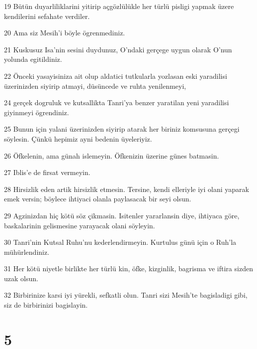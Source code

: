 \par 19 Bütün duyarliliklarini yitirip açgözlülükle her türlü pisligi yapmak üzere kendilerini sefahate verdiler.
\par 20 Ama siz Mesih'i böyle ögrenmediniz.
\par 21 Kuskusuz Isa'nin sesini duydunuz, O'ndaki gerçege uygun olarak O'nun yolunda egitildiniz.
\par 22 Önceki yasayisiniza ait olup aldatici tutkularla yozlasan eski yaradilisi üzerinizden siyirip atmayi, düsüncede ve ruhta yenilenmeyi,
\par 24 gerçek dogruluk ve kutsallikta Tanri'ya benzer yaratilan yeni yaradilisi giyinmeyi ögrendiniz.
\par 25 Bunun için yalani üzerinizden siyirip atarak her biriniz komsusuna gerçegi söylesin. Çünkü hepimiz ayni bedenin üyeleriyiz.
\par 26 Öfkelenin, ama günah islemeyin. Öfkenizin üzerine günes batmasin.
\par 27 Iblis'e de firsat vermeyin.
\par 28 Hirsizlik eden artik hirsizlik etmesin. Tersine, kendi elleriyle iyi olani yaparak emek versin; böylece ihtiyaci olanla paylasacak bir seyi olsun.
\par 29 Agzinizdan hiç kötü söz çikmasin. Isitenler yararlansin diye, ihtiyaca göre, baskalarinin gelismesine yarayacak olani söyleyin.
\par 30 Tanri'nin Kutsal Ruhu'nu kederlendirmeyin. Kurtulus günü için o Ruh'la mühürlendiniz.
\par 31 Her kötü niyetle birlikte her türlü kin, öfke, kizginlik, bagrisma ve iftira sizden uzak olsun.
\par 32 Birbirinize karsi iyi yürekli, sefkatli olun. Tanri sizi Mesih'te bagisladigi gibi, siz de birbirinizi bagislayin.

\chapter{5}

